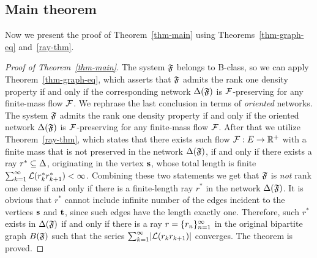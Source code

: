 \documentclass[12pt,oneside,a4paper]{amsart}
\begin{document}
      \medskip
      \subsection{Main theorem}
        Now we present the proof of Theorem~\ref{thm-main} using Theorems~\ref{thm-graph-eq} and~\ref{ray-thm}.
        \begin{proof}[Proof of Theorem~\ref{thm-main}]
          The system $\mathfrak{F}$ belongs to B-class, so we can apply Theorem~\ref{thm-graph-eq}, which asserts
            that $\mathfrak{F}$ admits the rank one density property if and only if
            the corresponding network $\Delta(\mathfrak{F})$ is $\mathcal{F}$-preserving for any
            finite-mass flow $\mathcal{F}$.
          We rephrase the last conclusion in terms of \emph{oriented} networks.
          The system $\mathfrak{F}$ admits the rank one density property if and only if
            the oriented network $\Delta(\mathfrak{F})$ is $\mathcal{F}$-preserving for any
            finite-mass flow $\mathcal{F}$.
          After that we utilize Theorem~\ref{ray-thm}, which states that there exists such
            flow $\mathcal{F}: E \to \mathbb{R}^{+}$ with a finite mass that is not preserved in
            the network $\Delta(\mathfrak{F})$, if and only if there exists a ray $r^{*} \subseteq \Delta$, originating in the vertex $\mathbf{s}$,
            whose total length is finite $\sum_{k=1}^\infty \mathcal{L}(r^{*}_k r^{*}_{k+1}) < \infty$.
          Combining these two statements we get that $\mathfrak{F}$ is \emph{not} rank one dense if and only if
            there is a finite-length ray $r^*$ in the network $\Delta(\mathfrak{F})$.
          It is obvious that $r^*$ cannot include infinite number of the edges incident to the vertices
            $\mathbf{s}$ and $\mathbf{t}$, since such edges have the length exactly one.
          Therefore, such $r^*$ exists in $\Delta(\mathfrak{F})$ if and only if there is a ray $r=\{{r}_n\}_{n=1}^\infty$ in the original bipartite graph $B(\mathfrak{F})$ such that
            the series $\sum_{k=1}^\infty\lvert\mathcal{L}(r_k r_{k+1})\rvert$ converges.
          The theorem is proved.
        \end{proof}
\end{document}
